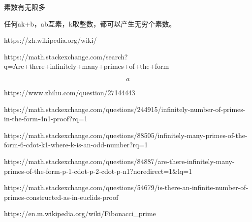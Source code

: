 \usepackage{amsmath}
\usepackage[utf8]{inputenc}
\usepackage[T1]{fontenc}



素数有无限多

任何ak+b，ab互素，k取整数，都可以产生无穷个素数。

https://zh.wikipedia.org/wiki/%

https://math.stackexchange.com/search?q=Are+there+infinitely+many+primes+of+the+form

$$
a
$$

https://www.zhihu.com/question/27144443

https://math.stackexchange.com/questions/244915/infinitely-number-of-primes-in-the-form-4n1-proof?rq=1

https://math.stackexchange.com/questions/88505/infinitely-many-primes-of-the-form-6-cdot-k1-where-k-is-an-odd-number?rq=1

https://math.stackexchange.com/questions/84887/are-there-infinitely-many-primes-of-the-form-p-1-cdot-p-2-cdot-p-n1?noredirect=1&lq=1


https://math.stackexchange.com/questions/54679/is-there-an-infinite-number-of-primes-constructed-as-in-euclids-proof

https://en.m.wikipedia.org/wiki/Fibonacci_prime